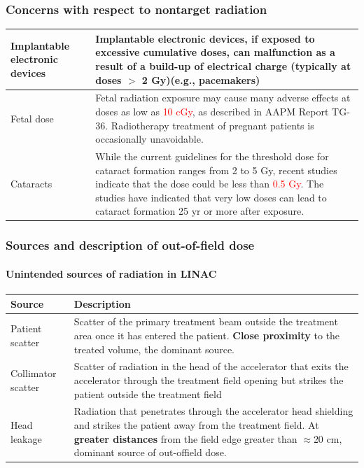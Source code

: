 \documentclass{beamer}
\begin{document}
\begin{frame}
  \frametitle{Concerns with respect to nontarget radiation}
  \begin{tabular}{p{2cm}|p{9cm}}
    \hline
    Implantable electronic devices & Implantable electronic devices, if exposed to excessive cumulative doses, can malfunction as a result of a build-up of electrical charge (typically at doses $>$ 2 Gy)(e.g., pacemakers) \\ \hline
    Fetal dose & Fetal radiation exposure may cause many adverse effects at doses as low as \textcolor{red}{10 cGy}, as described in AAPM Report TG-36. Radiotherapy treatment of pregnant patients is occasionally unavoidable. \\ \hline 
    Cataracts & While the current guidelines for the threshold dose for cataract formation ranges from 2 to 5 Gy, recent studies indicate that the dose could be less than \textcolor{red}{0.5 Gy}. The studies have indicated that very low doses can lead to cataract formation 25 yr or more after exposure. \\ \hline \hline

  \end{tabular}
\end{frame}



\begin{frame}
  \frametitle{Sources and description of out-of-field dose}
  \framesubtitle{Unintended sources of radiation in LINAC}
  \begin{table}
    \centering
    \begin{tabular}{p{2cm}|p{9cm}}
      \hline\hline
      Source & Description \\
      \hline 
      Patient scatter & Scatter of the primary treatment beam outside the treatment area once it has entered the patient. \textbf{Close proximity} to the treated volume, the dominant source.\\ \hline
      Collimator scatter & Scatter of radiation in the head of the accelerator that exits the accelerator through the treatment field opening but strikes the patient outside the treatment field \\ \hline
      Head leakage & Radiation that penetrates through the accelerator head shielding and strikes the patient away from the treatment field. At \textbf{greater distances} from the field edge greater than $\approx$20 cm, dominant source of out-offield dose. \\ \hline\hline
      
    \end{tabular}
  \end{table}
\end{frame}
\end{document}
